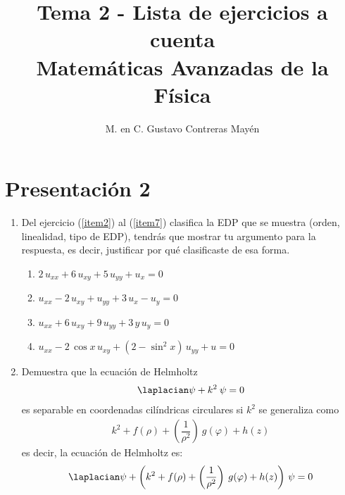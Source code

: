 
\title{Tema 2 - Lista de ejercicios a cuenta\\ \large{Matemáticas Avanzadas de la Física}\vspace{-3ex}}
\author{M. en C. Gustavo Contreras Mayén}
\date{ }

\vspace{-4cm}
\maketitle
\fontsize{14}{14}\selectfont
\section{Presentación 2}
\begin{enumerate}
\item  Del ejercicio (\ref{item2}) al (\ref{item7}) clasifica la EDP que se muestra (orden, linealidad, tipo de EDP), tendrás que mostrar tu argumento para la respuesta, es decir, justificar por qué clasificaste de esa forma.
\begin{enumerate}
\item $2 \, u_{xx} + 6 \, u_{xy} + 5 \, u_{yy} + u_{x} = 0$ \label{item2}
\item $u_{xx} - 2 \, u_{xy} + u_{yy} + 3 \, u_{x} - u_{y} = 0$ \label{item3}
\item $u_{xx} + 6 \, u_{xy} + 9 \, u_{yy} + 3 \, y \, u_{y} = 0$ \label{item5}
\item $u_{xx} - 2 \, \cos x \, u_{xy} +  (2 - \sin^{2} x) \, u_{yy} + u = 0$ \label{item7}
\end{enumerate}
\item Demuestra que la ecuación de Helmholtz
\begin{align*}
\laplacian \psi + k^{2} \: \psi = 0
\end{align*}
es separable en coordenadas cilíndricas circulares si $k^{2}$ se generaliza como
\begin{align*}
k^{2} + f(\rho) + \left( \dfrac{1}{\rho^{2}} \right) \: g(\varphi) + h(z)
\end{align*}
es decir, la ecuación de Helmholtz es:
\begin{align*}
\laplacian \psi + \left( k^{2} + f(\rho) + \left( \dfrac{1}{\rho^{2}} \right) \: g(\varphi) + h(z) \right) \, \psi = 0
\end{align*}
\end{enumerate}
